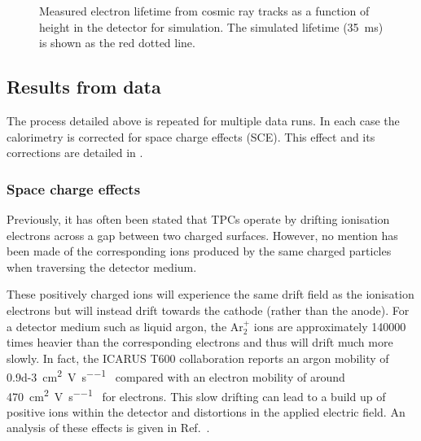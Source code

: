 \begin{figure}[h] 
	\begin{adjustbox}{max totalsize=.6\linewidth, center}
		
	\end{adjustbox}
	\caption[Measured electron lifetime as a function of height within the detector in simulation]{Measured electron lifetime from cosmic ray tracks as a function of height in the detector for simulation. The simulated lifetime (\SI{35}{\ms}) is shown as the red dotted line.}
	\label{fig:lifetimeNoSCE}
\end{figure}

\subsection{Results from data}
\label{sec:pdune_calibration:lifetime:data}

The process detailed above is repeated for multiple data runs.
In each case the calorimetry is corrected for space charge effects (SCE). 
This effect and its corrections are detailed in .

\subsubsection{Space charge effects}
\label{sec:pdune_calibration:lifetime:data:sce}

Previously, it has often been stated that TPCs operate by drifting ionisation electrons across a gap between two charged surfaces.
However, no mention has been made of the corresponding ions produced by the same charged particles when traversing the detector medium.

These positively charged ions will experience the same drift field as the ionisation electrons but will instead drift towards the cathode (rather than the anode).
For a detector medium such as liquid argon, the $\text{Ar}_{2}^{+}$ ions are approximately \num{140000} times heavier than the corresponding electrons and thus will drift much more slowly.
In fact, the ICARUS T600 collaboration reports an argon mobility of \SI{0.9d-3}{\cm\squared\per\volt\per\second}~\cite{icarusSpaceCharge} compared with an electron mobility of around \SI{470}{\cm\squared\per\volt\per\second}~\cite{electronMobility} for electrons.
This slow drifting can lead to a build up of positive ions within the detector and distortions in the applied electric field. 
An analysis of these effects is given in Ref.~\cite{spaceCharge2021}.

